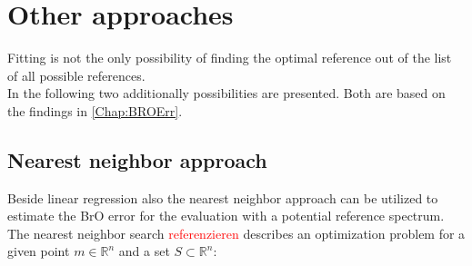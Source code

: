 \documentclass  [
  paper    = a4,
  BCOR     = 10mm,
  twoside,
  fontsize = 12pt,
  fleqn,
  toc      = bibnumbered,
  toc      = listofnumbered,
  numbers  = noendperiod,
  headings = normal,
  listof   = leveldown,
  version  = 3.03
]                                       {scrreprt}
\begin{document}
		
%	
%
%
%
	\section{Other approaches}

	Fitting is not the only possibility of finding the optimal reference out of the list of all possible references.\\
	In the following two additionally possibilities are presented. Both are based on the findings in \cref{Chap:BROErr}. 

\subsection{Nearest neighbor approach}


Beside linear regression also the nearest neighbor approach can be utilized to estimate the BrO error for the evaluation with a potential reference spectrum.
%
The nearest neighbor search \textcolor{red}{referenzieren} describes an optimization problem for a given point $m \in \mathbb{R}^n$ and a set $S \subset \mathbb{R}^n$:
\end{document}
